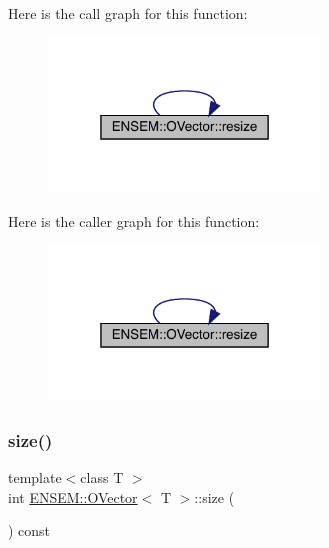 Here is the call graph for this function\+:
\nopagebreak
\begin{figure}[H]
\begin{center}
\leavevmode
\includegraphics[width=205pt]{d0/d8d/classENSEM_1_1OVector_a64fa4ad4d58dd32268c2bea8be1de212_cgraph}
\end{center}
\end{figure}
Here is the caller graph for this function\+:
\nopagebreak
\begin{figure}[H]
\begin{center}
\leavevmode
\includegraphics[width=205pt]{d0/d8d/classENSEM_1_1OVector_a64fa4ad4d58dd32268c2bea8be1de212_icgraph}
\end{center}
\end{figure}
\mbox{\label{classENSEM_1_1OVector_a715979c319905eb60532815bb3c77aab}} 
\subsubsection{\texorpdfstring{size()}{size()}\hspace{0.1cm}{\footnotesize\ttfamily [1/2]}}
{\footnotesize\ttfamily template$<$class T $>$ \\
int \mbox{\hyperlink{classENSEM_1_1OVector}{E\+N\+S\+E\+M\+::\+O\+Vector}}$<$ T $>$\+::size (\begin{DoxyParamCaption}{ }\end{DoxyParamCaption}) const\hspace{0.3cm}{\ttfamily [inline]}}




